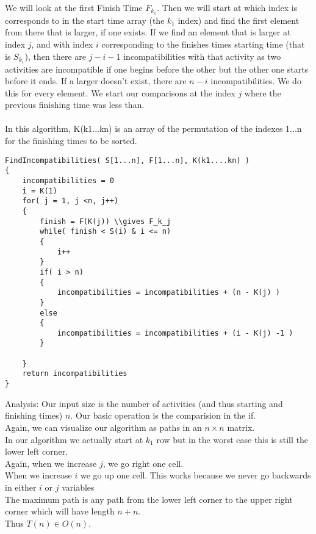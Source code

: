 \documentclass[12pt]{article}
\begin{document}
We will look at the first Finish Time $F_{k_1}$.  Then we will start at which index is corresponds to
in the start time array (the $k_1 $ index)  and find the first element from there that is larger, if one exists.
If we find an element that is larger at index $j$, and with index $i$ corresponding to the finishes times starting time (that is $S_{k_1}$), then there are $j-i -1$ incompatibilities with that activity
as two activities are incompatible if one begins before the other but the other one starts before it ends.
If a larger doesn't exist, there are $n - i$ incompatibilities.
We do this for every element.  We start our comparisons at the index $j$ where the previous finishing time was less than.
\\
\\
In this algorithm, K(k1...kn) is an array of the permutation of the indexes 1...n for the finishing times to be sorted.
 \begin{lstlisting}
FindIncompatibilities( S[1...n], F[1...n], K(k1....kn) )
{
	incompatibilities = 0
	i = K(1)
	for( j = 1, j <n, j++)
	{
		finish = F(K(j)) \\gives F_k_j
		while( finish < S(i) & i <= n)
		{
			i++
		}
		if( i > n)
		{
			incompatibilities = incompatibilities + (n - K(j) )
		}
		else
		{
			incompatibilities = incompatibilities + (i - K(j) -1 )
		}
		
	}
	return incompatibilities
}
\end{lstlisting}

Analysis:
Our input size is the number of activities (and thus starting and finishing times) $n$.  Our basic operation is the comparision in the if.\\
Again, we can visualize our algorithm as paths in  an $n \times n$ matrix.\\
In our algorithm we actually start at $k_1$ row but in the worst case this is still the lower left corner.\\
Again, when we increase $j$, we go right one cell.\\
When we increase $i$ we go up one cell. This works because  we never go backwards in either $i$ or $j$ variables\\
The maximum path is any path from the lower left corner to the upper right corner which will have length $n + n$.
\\
Thus $T(n) \in O(n)$.
\end{document}
